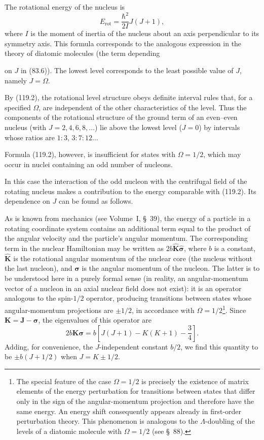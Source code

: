 The rotational energy of the nucleus is
\begin{equation}
 E_{\mathrm{rot}}=\frac{\hbar^2}{2I}J(J+1),
 \tag{119.2}
\end{equation}
where $I$ is the moment of inertia of the nucleus about an axis perpendicular
to its symmetry axis. This formula corresponds to the analogous expression in
the theory of diatomic molecules (the term depending

on $J$ in (83.6)). The lowest level corresponds to the least possible value of
$J$, namely $J=\Omega$.

By (119.2), the rotational level structure obeys definite interval rules that,
for a specified $\Omega$, are independent of the other characteristics of the
level. Thus the components of the rotational structure of the ground term of
an even--even nucleus (with $J=2,4,6,8,\ldots$) lie above the lowest level
($J=0$) by intervals whose ratios are $1:3$, $3:7:12\ldots$

Formula (119.2), however, is insufficient for states with $\Omega=1/2$, which
may occur in nuclei containing an odd number of nucleons.

In this case the interaction of the odd nucleon with the centrifugal field of
the rotating nucleus makes a contribution to the energy comparable with
(119.2). Its dependence on $J$ can be found as follows.

As is known from mechanics (see Volume~I, \S~39), the energy of a particle in
a rotating coordinate system contains an additional term equal to the product
of the angular velocity and the particle's angular momentum. The corresponding
term in the nuclear Hamiltonian may be written as
$2b\hat{\mathbf K}\hat{\boldsymbol\sigma}$, where $b$ is a constant,
$\hat{\mathbf K}$ is the rotational angular momentum of the nuclear core (the
nucleus without the last nucleon), and $\hat{\boldsymbol\sigma}$ is the
angular momentum of the nucleon. The latter is to be understood here in a
purely formal sense (in reality, an angular-momentum vector of a nucleon in an
axial nuclear field does not exist): it is an operator analogous to the
spin-$1/2$ operator, producing transitions between states whose
angular-momentum projections are $\pm1/2$, in accordance with
$\Omega=1/2$\footnote{The special feature of the case $\Omega=1/2$ is
precisely the existence of matrix elements of the energy perturbation for
transitions between states that differ only in the sign of the
angular-momentum projection and therefore have the same energy. An energy
shift consequently appears already in first-order perturbation theory. This
phenomenon is analogous to the $\Lambda$-doubling of the levels of a diatomic
molecule with $\Omega=1/2$ (see \S~88).}. Since
$\mathbf K=\mathbf J-\boldsymbol\sigma$, the eigenvalues of this operator are
\[
 2b\mathbf K\boldsymbol\sigma
 =b\left[J(J+1)-K(K+1)-\frac34\right].
\]
Adding, for convenience, the $J$-independent constant $b/2$, we find this
quantity to be $\pm b(J+1/2)$ when $J=K\pm1/2$.

